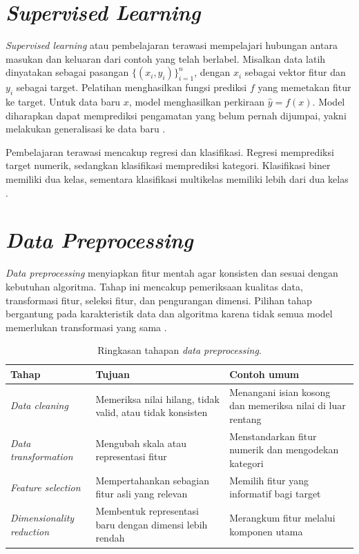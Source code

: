 \section{\textit{Supervised Learning}}

\textit{Supervised learning} atau pembelajaran terawasi mempelajari hubungan antara masukan dan keluaran dari contoh yang telah berlabel. Misalkan data latih dinyatakan sebagai pasangan $\{(x_i,y_i)\}_{i=1}^{n}$, dengan $x_i$ sebagai vektor fitur dan $y_i$ sebagai target. Pelatihan menghasilkan fungsi prediksi $f$ yang memetakan fitur ke target. Untuk data baru $x$, model menghasilkan perkiraan $\hat{y}=f(x)$. Model diharapkan dapat memprediksi pengamatan yang belum pernah dijumpai, yakni melakukan generalisasi ke data baru \cite{james2021islr,scikitlearn_userguide}.

Pembelajaran terawasi mencakup regresi dan klasifikasi. Regresi memprediksi target numerik, sedangkan klasifikasi memprediksi kategori. Klasifikasi biner memiliki dua kelas, sementara klasifikasi multikelas memiliki lebih dari dua kelas \cite{james2021islr}.

\section{\textit{Data Preprocessing}}

\textit{Data preprocessing} menyiapkan fitur mentah agar konsisten dan sesuai dengan kebutuhan algoritma. Tahap ini mencakup pemeriksaan kualitas data, transformasi fitur, seleksi fitur, dan pengurangan dimensi. Pilihan tahap bergantung pada karakteristik data dan algoritma karena tidak semua model memerlukan transformasi yang sama \cite{scikitlearn_preprocessing,scikitlearn_imputation}.

\begin{table}[H]
    \centering
    \caption{Ringkasan tahapan \textit{data preprocessing}.}
    \label{tab:data-preprocessing}
    \small
    \begin{tabular}{p{} p{} p{}}
        \toprule
        Tahap                             & Tujuan                                                    & Contoh umum                                                \\
        \midrule
        \textit{Data cleaning}            & Memeriksa nilai hilang, tidak valid, atau tidak konsisten & Menangani isian kosong dan memeriksa nilai di luar rentang \\
        \textit{Data transformation}      & Mengubah skala atau representasi fitur                    & Menstandarkan fitur numerik dan mengodekan kategori        \\
        \textit{Feature selection}        & Mempertahankan sebagian fitur asli yang relevan           & Memilih fitur yang informatif bagi target                  \\
        \textit{Dimensionality reduction} & Membentuk representasi baru dengan dimensi lebih rendah   & Merangkum fitur melalui komponen utama                     \\
        \bottomrule
    \end{tabular}
\end{table}

